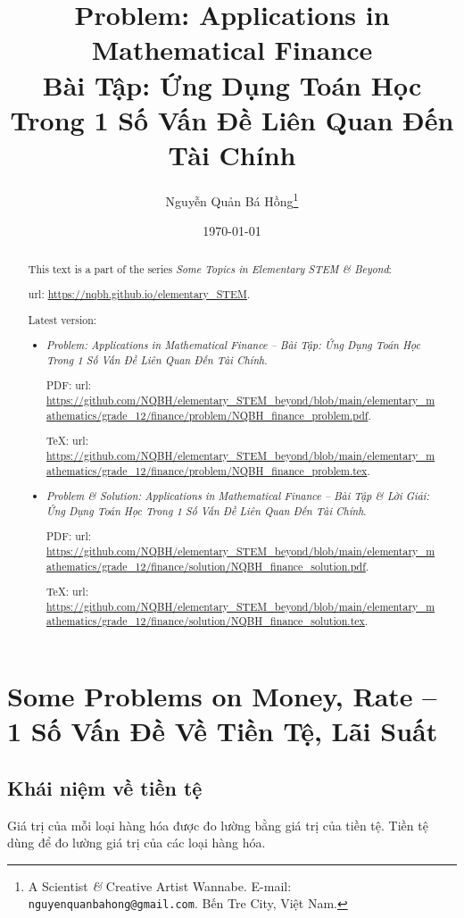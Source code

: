 \documentclass{article}
\title{Problem: Applications in Mathematical Finance\\Bài Tập: Ứng Dụng Toán Học Trong 1 Số Vấn Đề Liên Quan Đến Tài Chính}
\author{Nguyễn Quản Bá Hồng\footnote{A Scientist {\it\&} Creative Artist Wannabe. E-mail: {\tt nguyenquanbahong@gmail.com}. Bến Tre City, Việt Nam.}}
\date{\today}
\begin{document}
\maketitle
\begin{abstract}
	This text is a part of the series {\it Some Topics in Elementary STEM \& Beyond}:
	
	{\sc url}: \url{https://nqbh.github.io/elementary_STEM}.
	
	Latest version:
	\begin{itemize}
		\item {\it Problem: Applications in Mathematical Finance -- Bài Tập: Ứng Dụng Toán Học Trong 1 Số Vấn Đề Liên Quan Đến Tài Chính}.
		
		PDF: {\sc url}: \url{https://github.com/NQBH/elementary_STEM_beyond/blob/main/elementary_mathematics/grade_12/finance/problem/NQBH_finance_problem.pdf}.
		
		\TeX: {\sc url}: \url{https://github.com/NQBH/elementary_STEM_beyond/blob/main/elementary_mathematics/grade_12/finance/problem/NQBH_finance_problem.tex}.
		\item {\it Problem \& Solution: Applications in Mathematical Finance -- Bài Tập \& Lời Giải: Ứng Dụng Toán Học Trong 1 Số Vấn Đề Liên Quan Đến Tài Chính}.
		
		PDF: {\sc url}: \url{https://github.com/NQBH/elementary_STEM_beyond/blob/main/elementary_mathematics/grade_12/finance/solution/NQBH_finance_solution.pdf}.
		
		\TeX: {\sc url}: \url{https://github.com/NQBH/elementary_STEM_beyond/blob/main/elementary_mathematics/grade_12/finance/solution/NQBH_finance_solution.tex}.
	\end{itemize}
\end{abstract}
\tableofcontents


\section{Some Problems on Money, Rate -- 1 Số Vấn Đề Về Tiền Tệ, Lãi Suất}

\subsection{Khái niệm về tiền tệ}
Giá trị của mỗi loại hàng hóa được đo lường bằng giá trị của tiền tệ. Tiền tệ dùng để đo lường giá trị của các loại hàng hóa.
\end{document}
